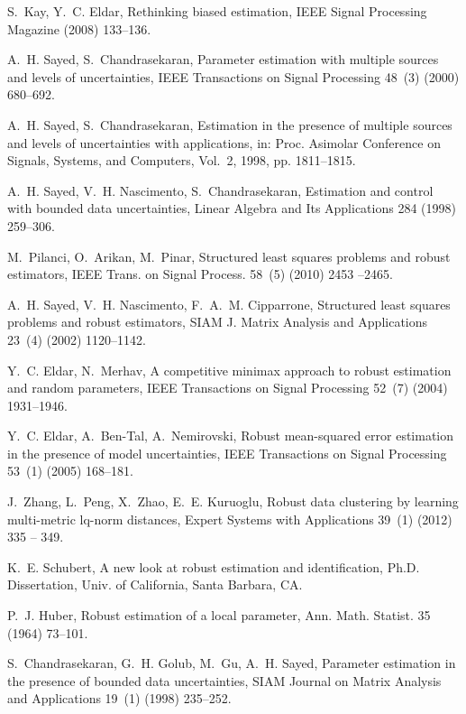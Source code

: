 \documentclass[review,sort&compress]{elsarticle}
\begin{document}
\begin{thebibliography}{10}
S.~Kay, Y.~C. Eldar, Rethinking biased estimation, IEEE Signal Processing
  Magazine (2008) 133--136.

A.~H. Sayed, S.~Chandrasekaran, Parameter estimation with multiple sources and
  levels of uncertainties, IEEE Transactions on Signal Processing 48~(3) (2000)
  680--692.

A.~H. Sayed, S.~Chandrasekaran, Estimation in the presence of multiple sources
  and levels of uncertainties with applications, in: Proc. Asimolar Conference
  on Signals, Systems, and Computers, Vol.~2, 1998, pp. 1811--1815.

A.~H. Sayed, V.~H. Nascimento, S.~Chandrasekaran, Estimation and control with
  bounded data uncertainties, Linear Algebra and Its Applications 284 (1998)
  259--306.

M.~Pilanci, O.~Arikan, M.~Pinar, Structured least squares problems and robust
  estimators, IEEE Trans. on Signal Process. 58~(5) (2010) 2453 --2465.

A.~H. Sayed, V.~H. Nascimento, F.~A.~M. Cipparrone, Structured least squares
  problems and robust estimators, SIAM J. Matrix Analysis and Applications
  23~(4) (2002) 1120--1142.

Y.~C. Eldar, N.~Merhav, A competitive minimax approach to robust estimation and
  random parameters, IEEE Transactions on Signal Processing 52~(7) (2004)
  1931--1946.

Y.~C. Eldar, A.~Ben-Tal, A.~Nemirovski, Robust mean-squared error estimation in
  the presence of model uncertainties, IEEE Transactions on Signal Processing
  53~(1) (2005) 168--181.

J.~Zhang, L.~Peng, X.~Zhao, E.~E. Kuruoglu, Robust data clustering by learning
  multi-metric lq-norm distances, Expert Systems with Applications 39~(1)
  (2012) 335 -- 349.

K.~E. Schubert, A new look at robust estimation and identification, Ph.D.
  Dissertation, Univ. of California, Santa Barbara, CA.

P.~J. Huber, Robust estimation of a local parameter, Ann. Math. Statist. 35
  (1964) 73--101.

S.~Chandrasekaran, G.~H. Golub, M.~Gu, A.~H. Sayed, Parameter estimation in the
  presence of bounded data uncertainties, SIAM Journal on Matrix Analysis and
  Applications 19~(1) (1998) 235--252.


\end{thebibliography}
\end{document}
